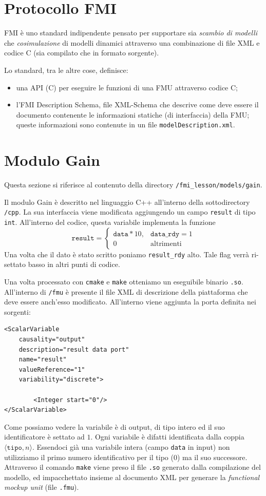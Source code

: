 \documentclass[]{IEEEtran}
\newcommand{\url}[1]{\texttt{#1}}
\newcommand{\code}[1]{\texttt{#1}}
\newcommand{\module}[1]{\textsf{\small #1}}
\begin{document}
\section{Protocollo FMI}

FMI è uno standard indipendente pensato per supportare sia \emph{scambio di modelli} che \emph{cosimulazione} di modelli dinamici attraverso una combinazione di file XML e codice C (sia compilato che in formato sorgente)\cite{fmi}.

Lo standard, tra le altre cose, definisce:
\begin{itemize}
    \item una API (C) per eseguire le funzioni di una FMU attraverso codice C;
    \item l'FMI Description Schema, file XML-Schema che descrive come deve essere il documento contenente le informazioni statiche (di interfaccia) della FMU; queste informazioni sono contenute in un file \code{modelDescription.xml}.
\end{itemize}

\section{Modulo \module{Gain}}

Questa sezione si riferisce al contenuto della directory \url{/fmi_lesson/models/gain}.

Il modulo \module{Gain} è descritto nel linguaggio C++ all'interno della sottodirectory \url{/cpp}. La sua interfaccia viene modificata aggiungendo un campo \code{result} di tipo \code{int}. All'interno del codice, questa variabile implementa la funzione
\[ \code{result} = \begin{cases} \code{data} * 10, & \code{data_rdy} = 1 \\ 0 & \text{altrimenti} \end{cases} \]
Una volta che il dato è stato scritto poniamo \code{result_rdy} alto. Tale flag verrà ri-settato basso in altri punti di codice. 

Una volta processato con \code{cmake} e \code{make} otteniamo un eseguibile binario \code{.so}. All'interno di \url{/fmu} è presente il file XML di descrizione della piattaforma che deve essere anch'esso modificato. All'interno viene aggiunta la porta definita nei sorgenti:
\begin{verbatim}
<ScalarVariable 
    causality="output" 
    description="result data port" 
    name="result" 
    valueReference="1" 
    variability="discrete">
    
        <Integer start="0"/>
</ScalarVariable>
\end{verbatim}
Come possiamo vedere la variabile è di output, di tipo intero ed il suo identificatore è settato ad $1$. Ogni variabile è difatti identificata dalla coppia $\langle \code{tipo}, n \rangle$. Essendoci già una variabile intera (campo \code{data} in input) non utilizziamo il primo numero identificativo per il tipo ($0$) ma il suo successore. 
Attraverso il comando \code{make} viene preso il file \code{.so} generato dalla compilazione del modello, ed impacchettato insieme al documento XML per generare la \emph{functional mockup unit} (file \code{.fmu}). 
\end{document}
